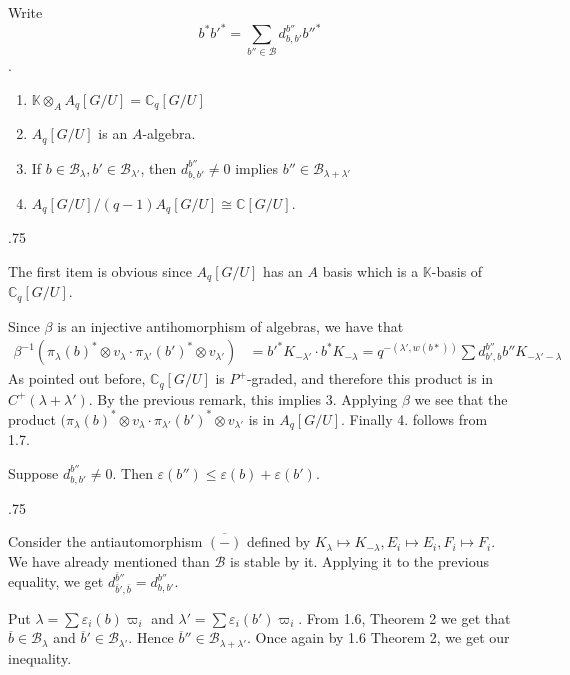 \documentclass[11pt,fleqn]{article}
\makeatletter
\renewenvironment{proof}[1][\proofname]{\par
  \pushQED{\qed}%
  \normalfont \topsep.75\paraskip\relax
  \trivlist
  \item[\hskip\labelsep
        \itshape
    #1\@addpunct{.}]\ignorespaces
}{%
  \popQED\endtrivlist\@endpefalse
}
\newcommand\CC{\mathbb C}
\newcommand\KK{\mathbb K}
\newcommand\ot{\otimes}
\newcommand\B{\mathcal B}
\makeatother
\begin{document}
Write $$b^* b'^* = \sum_{b'' \in \B} d_{b,b'}^{b''} b''^* $$.

\begin{Proposition*}
	\begin{enumerate}
		\item $\KK \ot_A A_q[G/U] = \CC_q[G/U]$
		\item $A_q[G/U]$ is an $A$-algebra.
		\item If $b \in \B_{\lambda}, b' \in \B_{\lambda'}$, then $d_{b,b'}^{b''}
			\neq 0$ implies $b'' \in \B_{\lambda + \lambda'}$
		\item $A_q[G/U]/(q-1)A_q[G/U] \cong \CC[G/U]$.
	\end{enumerate}
\end{Proposition*}
\begin{proof}
	The first item is obvious since $A_q[G/U]$ has an $A$ basis which is a $\KK$-basis
of $\CC_q[G/U]$.

	Since $\beta$ is an injective antihomorphism of algebras, we have that
	\begin{align*}
		\beta^{-1}(\pi_\lambda(b)^* \ot v_\lambda \cdot \pi_{\lambda'}(b')^* \ot
			v_{\lambda'}) &= b'^* K_{-\lambda'} \cdot b^* K_{-\lambda} = 
			q^{-(\lambda',w(b*))}\sum d_{b',b}^{b''} b'' K_{- \lambda' - \lambda}
	\end{align*}
	As pointed out before, $\CC_q[G/U]$ is $P^+$-graded, and therefore this product is
	in $C^+(\lambda + \lambda')$. By the previous remark, this implies 3. Applying
	$\beta$ we see that the product $(\pi_\lambda(b)^* \ot v_\lambda \cdot
	\pi_{\lambda'}(b')^* \ot v_{\lambda'}$ is in $A_q[G/U]$. Finally 4. follows from
	1.7.
\end{proof}

\begin{Corollary*}
	Suppose $d_{b,b'}^{b''} \neq 0$. Then $\varepsilon(b'') \leq \varepsilon(b) +
\varepsilon(b')$.
\end{Corollary*}
\begin{proof}
	Consider the antiautomorphism $\overline{(-)}$ defined by $K_\lambda \mapsto
	K_{-\lambda}, E_i \mapsto E_i, F_i \mapsto F_i$. We have already mentioned than
	$\B$ is stable by it. Applying it to the previous equality, we get $d_{\overline
	b', \overline b}^{\overline b''} = d_{b,b'}^{b''}$. 

	Put $\lambda = \sum \varepsilon_i(b) \varpi_i$ and $\lambda' = \sum
	\varepsilon_i(b') \varpi_i$. From 1.6, Theorem 2 we get that $\overline b \in
	\B_\lambda$ and $\overline b' \in \B_{\lambda'}$. Hence $\overline b'' \in
	\B_{\lambda + \lambda'}$. Once again by 1.6 Theorem 2, we get our inequality.
\end{proof}
\end{document}
